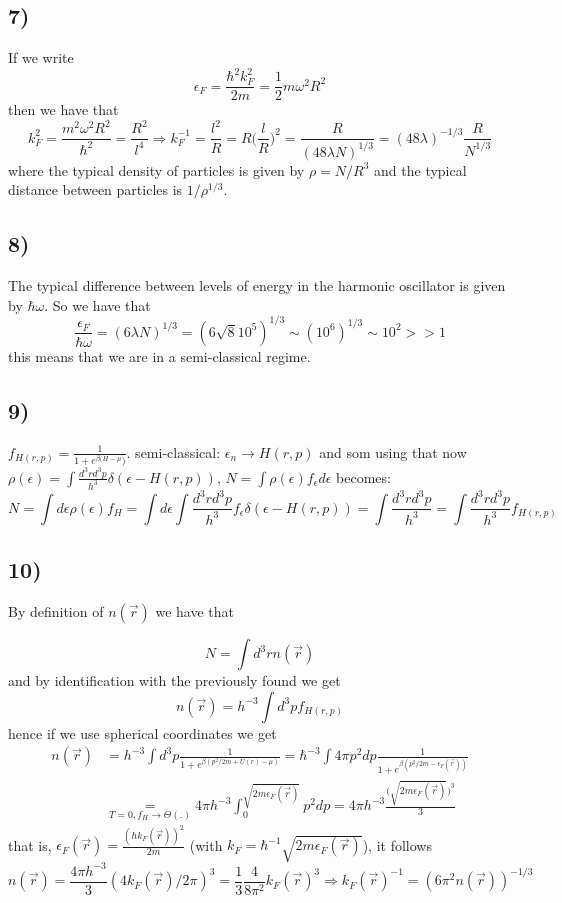 \documentclass[10pt,a4paper]{book}
\begin{document}
\subsection*{7)}
If we write $$\epsilon_F=\frac{\hbar^2k_F^2}{2m}=\frac{1}{2}m\omega^2 R^2$$ then we have that
$$k_F^2=\frac{m^2\omega^2 R^2}{\hbar^2}=\frac{R^2}{l^4}\Rightarrow k_F^{-1}=\frac{l^2}{R}=R\bigg(\frac{l}{R}\bigg)^2=\frac{R}{(48\lambda N)^{1/3}}={(48\lambda)^{-1/3}}\frac{R}{N^{1/3}}$$
 where the typical density of particles is given by $\rho=N/R^3$ and the typical distance between particles is $1/\rho^{1/3}$.

\subsection*{8)}
The typical difference between levels of energy in the harmonic oscillator is given by $\hbar \omega$. So we have that
$$ \frac{\epsilon_F}{\hbar\omega}=(6\lambda N)^{1/3}=(6\sqrt{8} 10^5)^{1/3}\sim (10^6)^{1/3}\sim 10^2>>1$$ this means that we are in a semi-classical regime. 

\subsection*{9)}
$f_{H(r,p)}=\frac{1}{1+e^{\beta( H-\mu})}$. semi-classical: $\epsilon_n\to H(r,p)$ and som using that now $\rho(\epsilon)=\int\frac{d^3rd^3p}{h^3}\delta(\epsilon-H(r,p))$, $N=\int\rho(\epsilon)f_{\epsilon}d\epsilon$  becomes:
$$N=\int d\epsilon\rho(\epsilon)f_H=\int d\epsilon\int\frac{d^3rd^3p}{h^3}f_{\epsilon}\delta(\epsilon-H(r,p))=\int\frac{d^3rd^3p}{h^3}=\int\frac{d^3rd^3p}{h^3}f_{H(r,p)}$$


\subsection*{10)}
By definition of $n(\vec{r})$ we have that

$$N=\int d^3r n(\vec{r})$$
and by identification with the previously found we get 
$$n(\vec{r})=h^{-3}\int d^3pf_{H(r,p)}$$
hence if we use spherical coordinates we get 
\begin{align*}
n(\vec{r})&=h^{-3}\int d^3p\frac{1}{1+e^{\beta(p^2/2m+U(r)-\mu)}}=\hbar^{-3}\int 4\pi p^2dp\frac{1}{1+e^{\beta(p^2/2m-\epsilon_F(\vec{r}))}}
\\
&\underset{T=0,f_H\to\Theta(.)}{=}4\pi h^{-3}\int_0^{\sqrt{2m\epsilon_F(\vec{r})}}p^2 dp=4\pi h^{-3}\frac{\big(\sqrt{2m\epsilon_F(\vec{r})}\big)^3}{3}
\end{align*} that is, $\epsilon_F(\vec{r})=\frac{(\hbar k_F(\vec{r}))^2}{2m}$ (with $k_F=\hbar^{-1}\sqrt{2m\epsilon_F(\vec{r})}$), it follows 
$$n(\vec{r})=\frac{4\pi h^{-3}}{3}(4k_F(\vec{r})/2\pi)^3=\frac{1}{3}\frac{4}{8\pi^2}k_F(\vec{r})^3\Rightarrow k_F(\vec{r})^{-1}=(6\pi^2 n(\vec{r}))^{-1/3}$$
\end{document}
